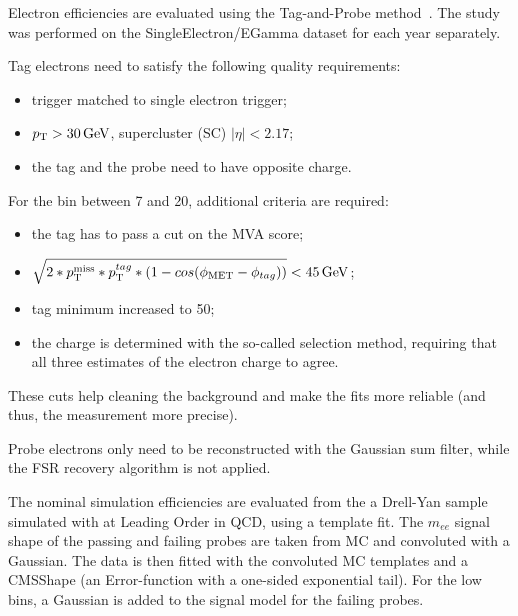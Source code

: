 Electron efficiencies are evaluated using the Tag-and-Probe method~\cite{CMS-EWK-10-005}.
The study was performed on the SingleElectron/EGamma dataset for each year separately.

Tag electrons need to satisfy the following quality requirements:
\begin{itemize}
\item trigger matched to single electron trigger;
\item $p_{\mathrm{T}} > 30 \,\text{Ge\hspace{-.08em}V}$, supercluster (SC) $|\eta| < 2.17$;%
\item the tag and the probe need to have opposite charge.
\end{itemize}

For the bin between 7 and 20\GeV, additional criteria are required:
\begin{itemize}
\item the tag has to pass a cut on the MVA score;
\item $\sqrt{2*p_{\mathrm{T}}^\text{miss}*p_{\mathrm{T}}^{tag}*(1-cos(\phi_{\rm MET}-\phi_{tag}))} < 45 \,\text{Ge\hspace{-.08em}V}$;
\item tag minimum \pt increased to 50\GeV;
\item the charge is determined with the so-called selection method, requiring that all three estimates of the electron charge to agree.
\end{itemize}
These cuts help cleaning the background and make the fits more reliable (and thus, the measurement more precise).

Probe electrons only need to be reconstructed with the Gaussian sum filter, while the FSR recovery algorithm is not applied.

The nominal simulation efficiencies are evaluated from the a Drell-Yan sample simulated with \MADGRAPH at Leading Order in QCD,
using a template fit.
The $m_{ee}$ signal shape of the passing and failing probes are taken from MC and convoluted with a Gaussian.
The data is then fitted with the convoluted MC templates and a CMSShape (an Error-function with a one-sided exponential tail).
For the low \pt bins, a Gaussian is added to the signal model for the failing probes.


